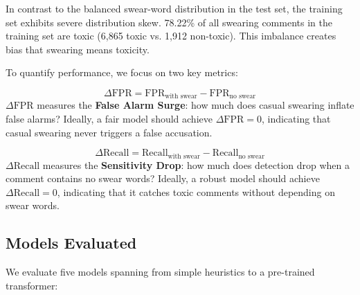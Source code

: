 \documentclass[11pt]{article}
\begin{document}
In contrast to the balanced swear-word distribution in the test set,
the training set exhibits severe distribution skew. 78.22\% of all
swearing comments in the training set are toxic (6,865 toxic vs. 1,912
non-toxic). This imbalance creates bias that swearing means toxicity.

To quantify performance, we focus on two key metrics:

\begin{equation}
  \Delta\text{FPR} = \text{FPR}_{\text{with swear}} -
  \text{FPR}_{\text{no swear}}
\end{equation}
$\Delta\text{FPR}$ measures the \textbf{False Alarm Surge}: how much
does casual swearing inflate false alarms? Ideally, a fair model
should achieve $\Delta\text{FPR} = 0$, indicating that casual
swearing never triggers a false accusation.

\begin{equation}
  \Delta\text{Recall} = \text{Recall}_{\text{with swear}} -
  \text{Recall}_{\text{no swear}}
\end{equation}
$\Delta\text{Recall}$ measures the \textbf{Sensitivity Drop}: how
much does detection drop when a comment contains no swear words?
Ideally, a robust model should achieve $\Delta\text{Recall} = 0$,
indicating that it catches toxic comments without depending on swear words.

\subsection{Models Evaluated}

We evaluate five models spanning from simple heuristics to a
pre-trained transformer:
\end{document}
